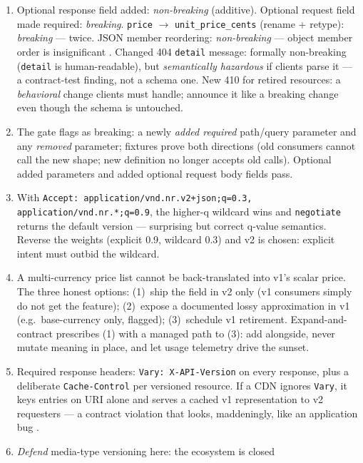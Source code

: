 \begin{enumerate}[label=\textbf{E9.\arabic*.}, leftmargin=2.8em]
  \item Optional response field added: \emph{non-breaking} (additive).
    Optional request field made required: \emph{breaking}. \texttt{price}
    $\to$ \texttt{unit\_price\_cents} (rename + retype): \emph{breaking} ---
    twice. JSON member reordering: \emph{non-breaking} --- object member
    order is insignificant \cite{rfc8259}. Changed 404 \texttt{detail}
    message: formally non-breaking (\texttt{detail} is human-readable), but
    \emph{semantically hazardous} if clients parse it --- a contract-test
    finding, not a schema one. New 410 for retired resources: a
    \emph{behavioral} change clients must handle; announce it like a
    breaking change even though the schema is untouched.
  \item The gate flags as breaking: a newly \emph{added required} path/query
    parameter and any \emph{removed} parameter; fixtures prove both
    directions (old consumers cannot call the new shape; new definition no
    longer accepts old calls). Optional added parameters and added optional
    request body fields pass.
  \item With \texttt{Accept:
    application/vnd.nr.v2+json;q=0.3, application/vnd.nr.*;q=0.9}, the
    higher-q wildcard wins and \texttt{negotiate} returns the default
    version --- surprising but correct q-value semantics. Reverse the
    weights (explicit 0.9, wildcard 0.3) and v2 is chosen: explicit intent
    must outbid the wildcard.
  \item A multi-currency price list cannot be back-translated into v1's
    scalar price. The three honest options: (1)~ship the field in v2 only
    (v1 consumers simply do not get the feature); (2)~expose a documented
    lossy approximation in v1 (e.g.\ base-currency only, flagged);
    (3)~schedule v1 retirement. Expand-and-contract prescribes (1) with a
    managed path to (3): add alongside, never mutate meaning in place, and
    let usage telemetry drive the sunset.
  \item Required response headers: \texttt{Vary: X-API-Version} on every
    response, plus a deliberate \texttt{Cache-Control} per versioned
    resource. If a CDN ignores \texttt{Vary}, it keys entries on URI alone
    and serves a cached v1 representation to v2 requesters --- a contract
    violation that looks, maddeningly, like an application bug
    \cite{rfc9110}.
  \item \emph{Defend} media-type versioning here: the ecosystem is closed

\end{enumerate}
